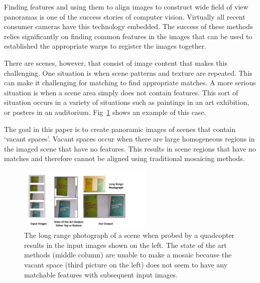 \documentclass[10pt,twocolumn,letterpaper]{article}
\begin{document}
Finding features and using them to align images to construct wide field
of view panoramas is one of the success stories of
computer vision.  Virtually all recent consumer cameras have this
technology embedded.  The success of these methods relies significantly on
finding common features in the images that can be used to established the
 appropriate warps to register the images together.

There are scenes, however, that consist of image content that makes this
challenging.  One situation is when scene patterns and texture are repeated.  
This can make it challenging for matching to find appropriate matches.
A more serious situation is when a scene area simply
does not contain features.  This sort of situation occurs in a variety
of situations such as paintings in an art exhibition, or posters in an
auditorium.  Fig~\ref{fig:teaser} shows an example of this case.

The goal in this paper is to create panoramic images of scenes that contain
`vacant spaces'.  Vacant spaces occur when there are large homogeneous regions in 
the imaged scene that have no features.   This results in scene regions that
have no matches and therefore cannot be aligned using traditional mosaicing methods.

\begin{figure}[t!]
  \centering
  \includegraphics[width=0.57\textwidth]{figures/teaser.pdf}
  \caption{ \label{fig:teaser} The long range photograph of a scene when probed
    by a quadcopter results in the input images shown on the left.  The
    state of the art methods (middle column) are unable to make a mosaic because the
    vacant space (third picture on the left) does not seem to have any
    matchable features with subsequent input images.
    }
\end{figure}
\end{document}
